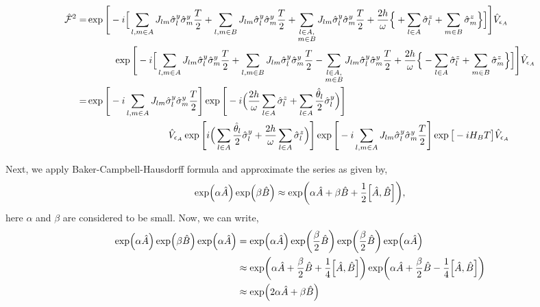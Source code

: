 \documentclass[%
reprint,
superscriptaddress,
amsmath,amssymb,showkeys,
aps,
prb,
]{revtex4-2}
\begin{document}
	\begin{align}
		\hat{\mathcal{F}}^2 
		=& \exp\Bigg[-i \Big[ \sum_{l,m\in A}J_{lm} \hat{\sigma}^y_l\hat{\sigma}^y_m\frac{T}{2} +\sum_{l,m\in B}J_{lm} \hat{\sigma}^y_l\hat{\sigma}^y_m\frac{T}{2}+\sum_{\substack{%
				l \in A,\\
				m \in B\hfill}} J_{lm}\hat{\sigma}^y_l\hat{\sigma}^y_m\frac{T}{2} +\frac{2h}{\omega }\Big\{ +\sum_{l\in A}^{}\hat{\sigma}^z_l + \sum_{m\in B}^{}\hat{\sigma}^z_m\Big\}\Big]\Bigg] \hat{V}_{\epsilon_A} \nonumber\\
		& \hspace{1 cm}\exp\Bigg[-i \Big[ \sum_{l,m\in A}J_{lm} \hat{\sigma}^y_l\hat{\sigma}^y_m\frac{T}{2} +\sum_{l,m\in B}J_{lm} \hat{\sigma}^y_l\hat{\sigma}^y_m\frac{T}{2}-\sum_{\substack{%
				l \in A,\\
				m \in B\hfill}} J_{lm}\hat{\sigma}^y_l\hat{\sigma}^y_m\frac{T}{2} +\frac{2h}{\omega}\Big\{ -\sum_{l\in A}^{}\hat{\sigma}^z_l + \sum_{m\in B}^{}\hat{\sigma}^z_m\Big\}\Big]\Bigg] \hat{V}_{\epsilon_A}\nonumber\\
		=& \exp\Bigg[-i \sum_{l,m\in A}J_{lm} \hat{\sigma}^y_l\hat{\sigma}^y_m\frac{T}{2}\Bigg] \exp\Bigg[-i\Big(\frac{2h}{\omega } \sum_{l\in A}^{}\hat{\sigma}^z_l + \sum_{l \in A}\frac{\hat{\theta}_{l}}{2}\hat{\sigma}^y_l\Big)\Bigg]\nonumber\\ 
		&\hspace{3cm} \hat{V}_{\epsilon_A} \exp\Bigg[i \Big(\sum_{l \in A}\frac{\hat{\theta}_{l}}{2}\hat{\sigma}^y_l + \frac{2h}{\omega} \sum_{l\in A}^{}\hat{\sigma}^z_l\Big)\Bigg] \exp\Bigg[-i\sum_{l,m\in A}J_{lm} \hat{\sigma}^y_l\hat{\sigma}^y_m\frac{T}{2}\Bigg] \exp\big[-i H_B T\big]\hat{V}_{\epsilon_A}
		\label{eq:floqop1}
		\end{align}

Next, we apply Baker-Campbell-Hausdorff formula \cite{Scharf_1988} and approximate the series as given by,
\begin{equation}
\exp(\alpha \hat{A}) \exp(\beta \hat{B}) \approx \exp(\alpha \hat{A} + \beta\hat{B} + \frac12 \comm{\hat{A}}{\hat{B}}),
\end{equation}
here $\alpha $ and $\beta$ are considered to be small. Now, we can write\cite{sakurai_phys_nodate},
\begin{align}
\exp(\alpha \hat{A}) \exp(\beta \hat{B}) \exp(\alpha \hat{A}) &= \exp(\alpha \hat{A})\exp(\frac{\beta}{2} \hat{B})\exp(\frac{\beta}{2} \hat{B}) \exp(\alpha \hat{A})\nonumber\\
&\approx \exp(\alpha \hat{A} + \frac{\beta}{2}\hat{B} + \frac14 \comm{\hat{A}}{\hat{B}}) \exp(\alpha \hat{A} + \frac{\beta}{2}\hat{B} - \frac14 \comm{\hat{A}}{\hat{B}})\nonumber\\
&\approx \exp(2\alpha \hat{A} + \beta\hat{B})
\label{eq:bch}
\end{align}
\end{document}
